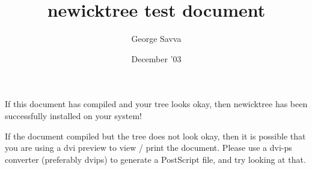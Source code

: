 \documentclass{article}
\begin{document}
\title{\textsf{newicktree} test document}
\author{George Savva}
\date{December '03}
\maketitle

If this document has compiled and your tree looks okay, then \textsf{newicktree} has been successfully installed on your system!

If the document compiled but the tree does not look okay, then it is possible that you are using a dvi preview to view / print the document.  Please use a dvi-ps converter (preferably dvips) to generate a PostScript file, and try looking at that.

\begin{newicktree}
\righttree
\end{newicktree}
\end{document}
